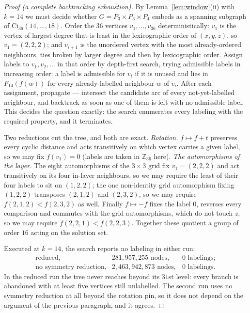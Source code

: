 \documentclass[11pt]{amsart}
\theoremstyle{remark}
\begin{document}
\begin{proof}[Proof (a complete backtracking exhaustion)]
By Lemma~\ref{lem:window}(ii) with $k=14$ we must decide whether $G=P_3\times P_3\times P_4$
embeds as a spanning subgraph of $\mathrm{Ci}_{36}(14,\dots,18)$. Order the $36$ vertices
$v_1,\dots,v_{36}$ deterministically: $v_1$ is the vertex of largest degree that is least in the
lexicographic order of $(x,y,z)$, so $v_1=(2,2,2)$; and $v_{i+1}$ is the unordered vertex with the
most already-ordered neighbours, ties broken by larger degree and then by lexicographic order.
Assign labels to $v_1,v_2,\dots$ in that order by depth-first search, trying admissible labels in
increasing order: a label is admissible for $v_i$ if it is unused and lies in $F_{14}(f(w))$ for
every already-labelled neighbour $w$ of $v_i$. After each assignment, propagate --- intersect the
candidate arc of every not-yet-labelled neighbour, and backtrack as soon as one of them is left
with no admissible label. This decides the question exactly: the search enumerates every
labeling with the required property, and it terminates.

Two reductions cut the tree, and both are exact.
\emph{Rotation.} $f\mapsto f+t$ preserves every cyclic distance and acts transitively on which
vertex carries a given label, so we may fix $f(v_1)=0$ (labels are taken in $\mathbb Z_{36}$
here).
\emph{The automorphisms of the layer.} The eight automorphisms of the $3\times3$ grid fix
$v_1=(2,2,2)$ and act transitively on its four in-layer neighbours, so we may require the least
of their four labels to sit on $(1,2,2)$; the one non-identity grid automorphism fixing $(1,2,2)$
transposes $(2,1,2)$ and $(2,3,2)$, so we may require $f(2,1,2)<f(2,3,2)$ as well. Finally
$f\mapsto-f$ fixes the label $0$, reverses every comparison and commutes with the grid
automorphisms, which do not touch $z$, so we may require $f(2,2,1)<f(2,2,3)$. Together these
quotient a group of order $16$ acting on the solution set.

Executed at $k=14$, the search reports no labeling in either run:
\[
\begin{array}{lrr}
 \text{reduced}, & 281{,}957{,}255 \text{ nodes}, & 0 \text{ labelings};\\
 \text{no symmetry reduction}, & 2{,}463{,}942{,}873 \text{ nodes}, & 0 \text{ labelings}.
\end{array}
\]
In the reduced run the tree never reaches beyond its $31$st level: every branch is
abandoned with at least five vertices still unlabelled. The second run uses no symmetry reduction
at all beyond the rotation pin, so it does not depend on the argument of the previous paragraph,
and it agrees.
\end{proof}
\end{document}
